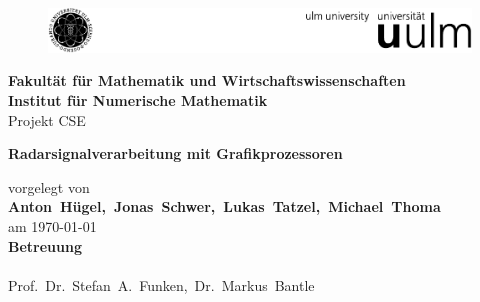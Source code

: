 
\begin{titlepage}
	\begin{figure}[h]
		\includegraphics[width=\textwidth]{images/unilogoA4}
	\end{figure}
	\vspace{1cm}
\begin{center}
{\large \bfseries Fakultät für Mathematik und Wirtschaftswissenschaften \\
\vspace{0.3cm}
\bfseries Institut für Numerische Mathematik \\
}
\vspace{2cm}
{\Large
Projekt CSE\\}

\vspace{2cm}
{\LARGE\bfseries
Radarsignalverarbeitung mit Grafikprozessoren\\
}
\end{center}

%
\vspace{3.5cm}
%
\begin{center}

vorgelegt von \\
\vspace{0.2cm}
{\bfseries\mbox{Anton Hügel, Jonas Schwer, Lukas Tatzel, Michael Thoma}} \\
\vspace{0.2cm}
am \mbox{\today} \\

\vspace*{1.2cm}
{\bfseries Betreuung} \\
\mbox{}\\
\mbox{Prof. Dr. Stefan A. Funken, Dr. Markus Bantle} \\
\end{center}
\vfill
\end{titlepage}
